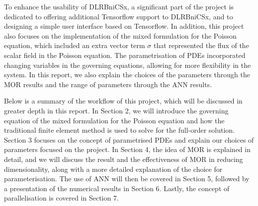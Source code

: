 To enhance the usability of DLRBniCSx, a significant part of the project is dedicated to offering additional Tensorflow \cite{tensorflow2015-whitepaper} support to DLRBniCSx, and to designing a simple user interface based on Tensorflow. In addition, this project also focuses on the implementation of the mixed formulation for the Poisson equation, which included an extra vector term $\sigma$ that represented the flux of the scalar field in the Poisson equation. The parametrisation of PDEs incorporated changing variables in the governing equations, allowing for more flexibility in the system. In this report, we also explain the choices of the parameters through the MOR results and the range of parameters through the ANN results.  

Below is a summary of the workflow of this project, which will be discussed in greater depth in this report. In Section 2, we will introduce the governing equation of the mixed formulation for the Poisson equation and how the traditional finite element method is used to solve for the full-order solution. Section 3 focuses on the concept of parametrised 
PDEs and explain our choices of parameters focused on the project. In Section 4, the idea of MOR is explained in detail, and we will discuss the result and the effectiveness of MOR in reducing dimensionality, along with a more detailed explanation of the choice for parameterisation. The use of ANN will then be covered in Section 5, followed by a presentation of the numerical results in Section 6. Lastly, the concept of parallelisation is covered in Section 7.  

\newpage